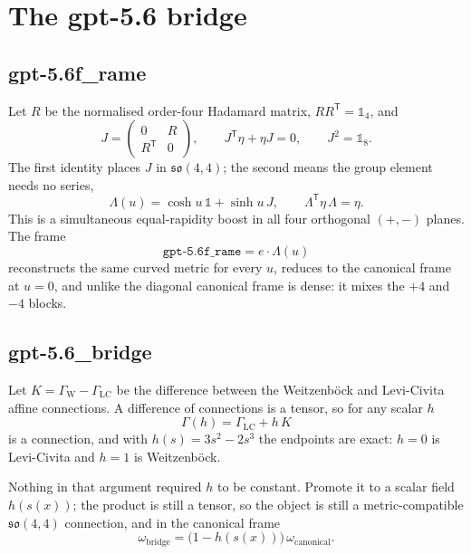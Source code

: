 \documentclass[11pt]{article}
\begin{document}
\section{The gpt-5.6 bridge}

\subsection{gpt-5.6f\_rame}

Let $R$ be the normalised order-four Hadamard matrix, $RR^{\mathsf T}=\mathbb{1}_4$, and
\begin{equation}
  J = \begin{pmatrix}0&R\\ R^{\mathsf T}&0\end{pmatrix},
  \qquad
  J^{\mathsf T}\eta+\eta J = 0,
  \qquad
  J^2 = \mathbb{1}_8 .
\end{equation}
The first identity places $J$ in $\mathfrak{so}(4,4)$; the second means the
group element needs no series,
\begin{equation}
  \Lambda(u) = \cosh u\,\mathbb{1} + \sinh u\,J,
  \qquad
  \Lambda^{\mathsf T}\eta\,\Lambda = \eta .
\end{equation}
This is a simultaneous equal-rapidity boost in all four orthogonal $(+,-)$
planes. The frame
\begin{equation}
  \texttt{gpt-5.6f\_rame} = e\cdot\Lambda(u)
\end{equation}
reconstructs the same curved metric for every $u$, reduces to the canonical
frame at $u=0$, and unlike the diagonal canonical frame is dense: it mixes the
$+4$ and $-4$ blocks.

\subsection{gpt-5.6\_bridge}

Let $K=\Gamma_{\mathrm W}-\Gamma_{\mathrm{LC}}$ be the difference between the
Weitzenb\"ock and Levi-Civita affine connections. A difference of connections is
a tensor, so for any scalar $h$
\begin{equation}
  \Gamma(h) = \Gamma_{\mathrm{LC}} + h\,K
\end{equation}
is a connection, and with $h(s)=3s^2-2s^3$ the endpoints are exact: $h=0$ is
Levi-Civita and $h=1$ is Weitzenb\"ock.

Nothing in that argument required $h$ to be constant. Promote it to a scalar
field $h(s(x))$; the product is still a tensor, so the object is still a
metric-compatible $\mathfrak{so}(4,4)$ connection, and in the canonical frame
\begin{equation}
  \omega_{\mathrm{bridge}} = \bigl(1-h(s(x))\bigr)\,\omega_{\mathrm{canonical}} .
\end{equation}
\end{document}
